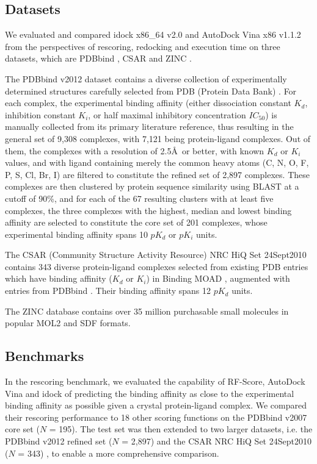 \subsection{Datasets}

We evaluated and compared idock x86\_64 v2.0 and AutoDock Vina x86 v1.1.2 from the perspectives of rescoring, redocking and execution time on three datasets, which are PDBbind \citep{529,530,1633}, CSAR \citep{857,960} and ZINC \citep{532,1178}.

The PDBbind v2012 dataset contains a diverse collection of experimentally determined structures carefully selected from PDB (Protein Data Bank) \citep{540,537}. For each complex, the experimental binding affinity (either dissociation constant $K_d$, inhibition constant $K_i$, or half maximal inhibitory concentration $IC_{50}$) is manually collected from its primary literature reference, thus resulting in the general set of 9,308 complexes, with 7,121 being protein-ligand complexes. Out of them, the complexes with a resolution of 2.5\AA\ or better, with known $K_d$ or $K_i$ values, and with ligand containing merely the common heavy atoms (C, N, O, F, P, S, Cl, Br, I) are filtered to constitute the refined set of 2,897 complexes. These complexes are then clustered by protein sequence similarity using BLAST at a cutoff of 90\%, and for each of the 67 resulting clusters with at least five complexes, the three complexes with the highest, median and lowest binding affinity are selected to constitute the core set of 201 complexes, whose experimental binding affinity spans 10 $pK_d$ or $pK_i$ units.

The CSAR (Community Structure Activity Resource) NRC HiQ Set 24Sept2010 contains 343 diverse protein-ligand complexes selected from existing PDB \citep{540,537} entries which have binding affinity ($K_d$ or $K_i$) in Binding MOAD \citep{517,518,1629}, augmented with entries from PDBbind \citep{529,530,1633}. Their binding affinity spans 12 $pK_d$ units.

The ZINC database contains over 35 million purchasable small molecules in popular MOL2 and SDF formats.

\subsection{Benchmarks}

In the rescoring benchmark, we evaluated the capability of RF-Score, AutoDock Vina and idock of predicting the binding affinity as close to the experimental binding affinity as possible given a crystal protein-ligand complex. We compared their rescoring performance to 18 other scoring functions on the PDBbind v2007 core set ($N$ = 195). The test set was then extended to two larger datasets, i.e. the PDBbind v2012 refined set ($N$ = 2,897) \citep{529,530,1633} and the CSAR NRC HiQ Set 24Sept2010 ($N$ = 343) \citep{857,960}, to enable a more comprehensive comparison.

